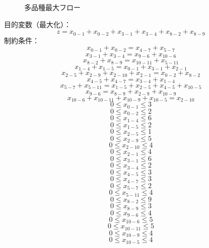 \documentclass{report}
\begin{document}
\begin{CJK}{UTF8}{min}
\begin{figure}[!h]
        \caption{多品種最大フロー}
    \end{figure}

    目的変数（最大化）：
    \[z=x_{0-1}+x_{0-2}+x_{3-1}+x_{3-4}+x_{8-2}+x_{8-9}\]
    制約条件：
    \[x_{0-1}+x_{0-2}=x_{4-7}+x_{5-7}\]
    \[x_{3-1}+x_{3-4}=x_{9-6}+x_{10-6}\]
    \[x_{8-2}+x_{8-9}=x_{10-11}+x_{5-11}\]
    \[x_{1-4}+x_{1-5}=x_{0-1}+x_{3-1}+x_{2-1}\]
    \[x_{2-5}+x_{2-9}+x_{2-10}+x_{2-1}=x_{0-2}+x_{8-2}\]
    \[x_{4-5}+x_{4-7}=x_{3-4}+x_{1-4}\]
    \[x_{5-7}+x_{5-11}=x_{1-5}+x_{2-5}+x_{4-5}+x_{10-5}\]
    \[x_{9-6}=x_{8-9}+x_{2-9}+x_{10-9}\]
    \[x_{10-6}+x_{10-11}+x_{10-9}+x_{10-5}=x_{2-10}\]
    \[0\leq x_{0-1}\leq3\]
    \[0\leq x_{0-2}\leq2\]
    \[0\leq x_{1-4}\leq6\]
    \[0\leq x_{1-5}\leq2\]
    \[0\leq x_{2-5}\leq1\]
    \[0\leq x_{2-9}\leq5\]
    \[0\leq x_{2-10}\leq4\]
    \[0\leq x_{2-1}\leq4\]
    \[0\leq x_{3-1}\leq6\]
    \[0\leq x_{3-4}\leq2\]
    \[0\leq x_{4-5}\leq3\]
    \[0\leq x_{4-7}\leq3\]
    \[0\leq x_{5-7}\leq2\]
    \[0\leq x_{5-11}\leq4\]
    \[0\leq x_{8-2}\leq9\]
    \[0\leq x_{8-9}\leq3\]
    \[0\leq x_{9-6}\leq4\]
    \[0\leq x_{10-6}\leq5\]
    \[0\leq x_{10-11}\leq5\]
    \[0\leq x_{10-9}\leq4\]
    \[0\leq x_{10-5}\leq4\]
    
    
    
    


\end{CJK}
\end{document}
